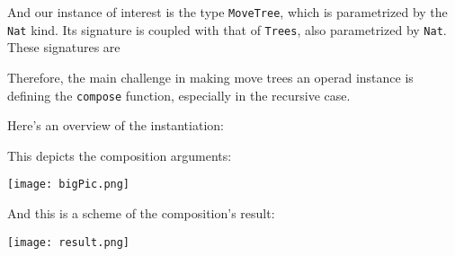 \documentclass{amsart}
\begin{document}
And our instance of interest is the type \texttt{MoveTree}, which is
parametrized by the \texttt{Nat} kind. Its signature is coupled with
that of \texttt{Trees}, also parametrized by \texttt{Nat}. These signatures
are



\bigskip
\bigskip

Therefore, the main challenge in making move trees an operad instance is
defining the \texttt{compose} function, especially in the recursive case.

\bigskip

Here's an overview of the instantiation:



This depicts the composition arguments:

\texttt{[image: bigPic.png]}

And this is a scheme of the composition's result:

\texttt{[image: result.png]}
\end{document}
